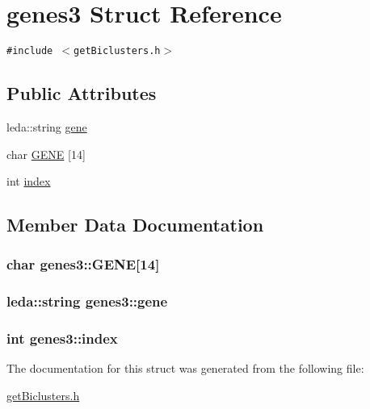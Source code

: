 \hypertarget{structgenes3}{
\section{genes3 Struct Reference}
\label{structgenes3}
}
{\tt \#include $<$getBiclusters.h$>$}

\subsection*{Public Attributes}
\begin{CompactItemize}
\item 
leda::string \hyperlink{structgenes3_4a54da1e9fc5474dce20372597308f35}{gene}
\item 
char \hyperlink{structgenes3_3c378670cffd850f09b209af63476585}{GENE} \mbox{[}14\mbox{]}
\item 
int \hyperlink{structgenes3_8de7e8d9738d0a290310f328e638a8b9}{index}
\end{CompactItemize}


\subsection{Member Data Documentation}
\hypertarget{structgenes3_3c378670cffd850f09b209af63476585}{
\subsubsection[{GENE}]{\setlength{\rightskip}{0pt plus 5cm}char {\bf genes3::GENE}\mbox{[}14\mbox{]}}}
\label{structgenes3_3c378670cffd850f09b209af63476585}


\hypertarget{structgenes3_4a54da1e9fc5474dce20372597308f35}{
\subsubsection[{gene}]{\setlength{\rightskip}{0pt plus 5cm}leda::string {\bf genes3::gene}}}
\label{structgenes3_4a54da1e9fc5474dce20372597308f35}


\hypertarget{structgenes3_8de7e8d9738d0a290310f328e638a8b9}{
\subsubsection[{index}]{\setlength{\rightskip}{0pt plus 5cm}int {\bf genes3::index}}}
\label{structgenes3_8de7e8d9738d0a290310f328e638a8b9}




The documentation for this struct was generated from the following file:\begin{CompactItemize}
\item 
\hyperlink{getBiclusters_8h}{getBiclusters.h}\end{CompactItemize}

